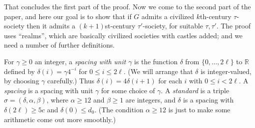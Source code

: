 \documentclass[titlepage,11pt]{article}
\def\LL{,\ldots,}
\begin{document}
	
	That concludes the first part of the proof.
	Now we come to the second part of the paper, and here our goal is to show that if $G$ admits a civilized $k$th-century
	$\tau$-society then it admits a $(k+1)$st-century $\tau'$-society, for suitable $\tau, \tau'$. The proof uses ``realms'', which
	are basically civilized societies with castles added; and 
	we need a number of further definitions. 
	
	For $\gamma\ge 0$ an integer, 
	a {\em spacing with unit $\gamma$} is the function $\delta$ from $\{0\LL 2\ell\}$ to $\mathbb{R}$ defined by 
	$\delta(i)  = \gamma4^{-i}$ for $0\le i\le 2\ell$. (We will arrange that $\delta$ is integer-valued, 
	by choosing $\gamma$ carefully.)  Thus $\delta(i)= 4\delta(i+1)$ for each $i$ with $0\le i<2\ell$.
	A {\em spacing} is a spacing with unit $\gamma$ for some choice of $\gamma$.
	A {\em standard} is a triple $\sigma= (\delta, \alpha,\beta)$, where
	$\alpha\ge 12$ and $\beta\ge 1$ are integers, and
	$\delta$ is a spacing with $\delta(2\ell)\ge 5c$ and $\delta(0)\le d_0$. (The condition $\alpha\ge 12$ is just to make some arithmetic come out more smoothly.)
	
	
\end{document}
